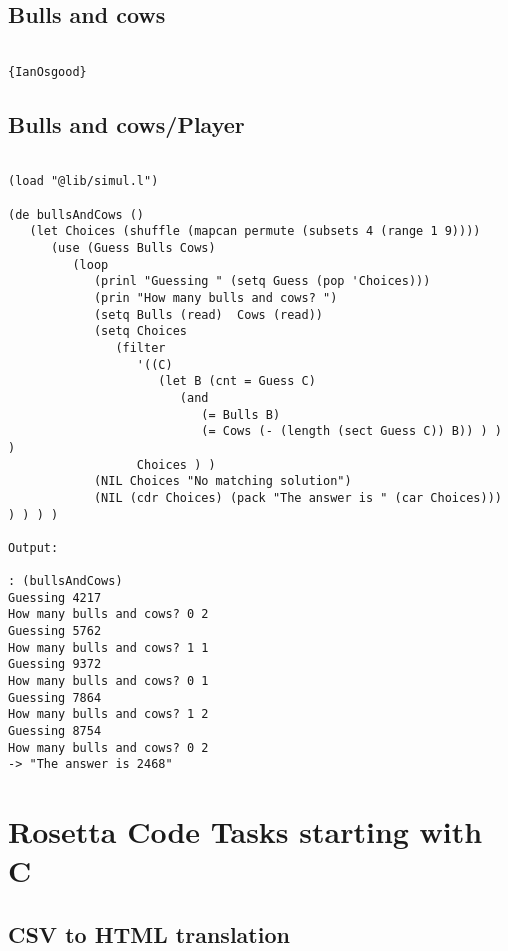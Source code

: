 \section*{Bulls and cows}

\begin{verbatim}

{IanOsgood}

\end{verbatim}

\section*{Bulls and cows/Player}

\begin{verbatim}

(load "@lib/simul.l")

(de bullsAndCows ()
   (let Choices (shuffle (mapcan permute (subsets 4 (range 1 9))))
      (use (Guess Bulls Cows)
         (loop
            (prinl "Guessing " (setq Guess (pop 'Choices)))
            (prin "How many bulls and cows? ")
            (setq Bulls (read)  Cows (read))
            (setq Choices
               (filter
                  '((C)
                     (let B (cnt = Guess C)
                        (and
                           (= Bulls B)
                           (= Cows (- (length (sect Guess C)) B)) ) ) )
                  Choices ) )
            (NIL Choices "No matching solution")
            (NIL (cdr Choices) (pack "The answer is " (car Choices))) ) ) ) )

Output:

: (bullsAndCows)
Guessing 4217
How many bulls and cows? 0 2
Guessing 5762
How many bulls and cows? 1 1
Guessing 9372
How many bulls and cows? 0 1
Guessing 7864
How many bulls and cows? 1 2
Guessing 8754
How many bulls and cows? 0 2
-> "The answer is 2468"

\end{verbatim}

\chapter{Rosetta Code Tasks starting with C}

\section*{CSV to HTML translation}

